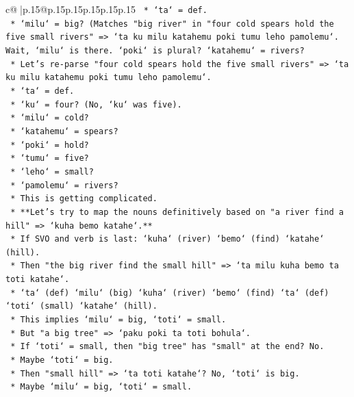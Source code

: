 \documentclass{article}
\begin{document}
{\begin{supertabular}{c@{$\;$}|p{.15\linewidth}@{}p{.15\linewidth}p{.15\linewidth}p{.15\linewidth}p{.15\linewidth}p{.15\linewidth}}
{{{\texttt{            *   `ta` = def.} \\
\texttt{            *   `milu` = big? (Matches "big river" in "four cold spears hold the five small rivers" => `ta ku milu katahemu poki tumu leho pamolemu`. Wait, `milu` is there. `poki` is plural? `katahemu` = rivers?} \\
\texttt{            *   Let's re{-}parse "four cold spears hold the five small rivers" => `ta ku milu katahemu poki tumu leho pamolemu`.} \\
\texttt{                *   `ta` = def.} \\
\texttt{                *   `ku` = four? (No, `ku` was five).} \\
\texttt{                *   `milu` = cold?} \\
\texttt{                *   `katahemu` = spears?} \\
\texttt{                *   `poki` = hold?} \\
\texttt{                *   `tumu` = five?} \\
\texttt{                *   `leho` = small?} \\
\texttt{                *   `pamolemu` = rivers?} \\
\texttt{            *   This is getting complicated.} \\
\texttt{    *   **Let's try to map the nouns definitively based on "a river find a hill" => `kuha bemo katahe`.**} \\
\texttt{        *   If SVO and verb is last: `kuha` (river) `bemo` (find) `katahe` (hill).} \\
\texttt{        *   Then "the big river find the small hill" => `ta milu kuha bemo ta toti katahe`.} \\
\texttt{            *   `ta` (def) `milu` (big) `kuha` (river) `bemo` (find) `ta` (def) `toti` (small) `katahe` (hill).} \\
\texttt{            *   This implies `milu` = big, `toti` = small.} \\
\texttt{            *   But "a big tree" => `paku poki ta toti bohula`.} \\
\texttt{                *   If `toti` = small, then "big tree" has "small" at the end? No.} \\
\texttt{                *   Maybe `toti` = big.} \\
\texttt{                *   Then "small hill" => `ta toti katahe`? No, `toti` is big.} \\
\texttt{                *   Maybe `milu` = big, `toti` = small.} \\
}}}
\end{supertabular}}
\end{document}
